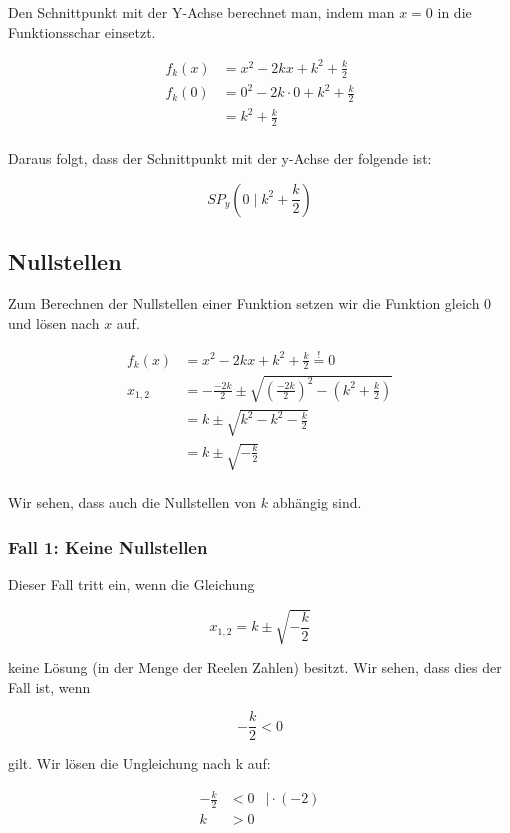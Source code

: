 \documentclass[12pt,a4paper]{article}
\begin{document}
Den Schnittpunkt mit der Y-Achse berechnet man, indem man $x=0$ in die Funktionsschar einsetzt. 

$$
\begin{aligned}
    f_k(x)&= x^2 - 2kx + k^2 + \frac{k}{2} \\
    f_k(0)&= 0^2 - 2k \cdot 0 + k^2 + \frac{k}{2} \\
    &= k^2 + \frac{k}{2} \\
\end{aligned}
$$

Daraus folgt, dass der Schnittpunkt mit der y-Achse der folgende ist:

$$
\label{eq:spy}
SP_y(0 \mid k^2 + \frac{k}{2})
$$

\subsection {Nullstellen}

Zum Berechnen der Nullstellen einer Funktion setzen wir die Funktion gleich 0 und lösen nach $x$ auf.

$$
\begin{aligned}
    f_k(x)&= x^2 - 2kx + k^2 + \frac{k}{2} \overset{!}{=} 0 \\
    x_{1,2} &= -\frac{-2k}{2} \pm \sqrt{(\frac{-2k}{2})^2 - (k^2 + \frac{k}{2})} \\
    &= k \pm \sqrt{k^2 - k^2 - \frac{k}{2}} \\
    &= k \pm \sqrt{- \frac{k}{2}} \\
\end{aligned}
$$

Wir sehen, dass auch die Nullstellen von $k$ abhängig sind.

\subsubsection{Fall 1: Keine Nullstellen}

Dieser Fall tritt ein, wenn die Gleichung 

$$ x_{1,2} = k \pm \sqrt {-\frac{k}{2}} $$

keine Lösung (in der Menge der Reelen Zahlen) besitzt. Wir sehen, dass dies der Fall ist, wenn

$$ -\frac{k}{2} < 0 $$

gilt. Wir lösen die Ungleichung nach k auf:

$$ 
\begin{aligned}
    -\frac k 2 & < 0 & \mid \cdot (-2) \\
    k & > 0 
\end{aligned}
$$
\end{document}

